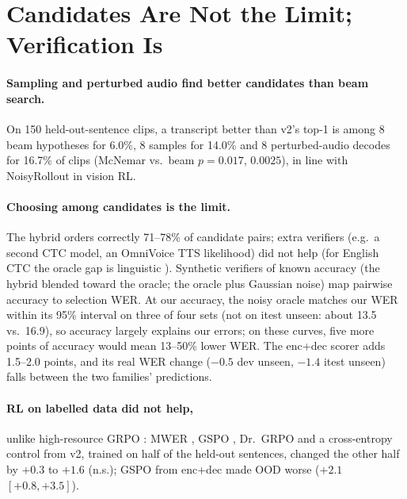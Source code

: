 \documentclass[runningheads]{llncs}
\newcommand{\ci}[2]{$[#1,#2]$}  %
\begin{document}
\section{Candidates Are Not the Limit; Verification Is}\label{sec:rl}
\paragraph{Sampling and perturbed audio find better candidates than beam search.} On 150
held-out-sentence clips, a transcript better than v2's top-1 is among 8 beam hypotheses for 6.0\%,
8 samples for 14.0\% and 8 perturbed-audio decodes for 16.7\% of clips (McNemar vs.\ beam
$p{=}0.017$, $0.0025$), in line with NoisyRollout \cite{liu2025noisyrollout} in vision RL.

\paragraph{Choosing among candidates is the limit.} The hybrid orders correctly 71--78\% of
candidate pairs; extra verifiers (e.g.\ a second CTC model, an OmniVoice TTS likelihood) did not
help (for English CTC the oracle gap is linguistic \cite{novosad2026oracle}). Synthetic verifiers
of known accuracy (the hybrid blended toward the oracle; the oracle plus Gaussian noise) map
pairwise accuracy to selection WER. At our accuracy, the noisy oracle matches our WER within its 95\% interval on three of four
sets (not on itest unseen: about 13.5 vs.\ 16.9), so accuracy largely explains our errors; on
these curves, five more points of accuracy would mean 13--50\% lower WER. The enc+dec scorer adds
1.5--2.0 points, and its real WER change ($-0.5$ dev unseen, $-1.4$ itest unseen) falls between
the two families' predictions.

\paragraph{RL on labelled data did not help,} unlike high-resource GRPO \cite{shivakumar2025grpoasr}:
MWER \cite{prabhavalkar2018mwer}, GSPO \cite{zheng2025gspo}, Dr.~GRPO \cite{liu2025drgrpo} and a
cross-entropy control from v2, trained on half of the held-out sentences, changed the other half
by $+0.3$ to $+1.6$ (n.s.); GSPO from enc+dec made OOD worse ($+2.1$ \ci{+0.8}{+3.5}).
\end{document}

